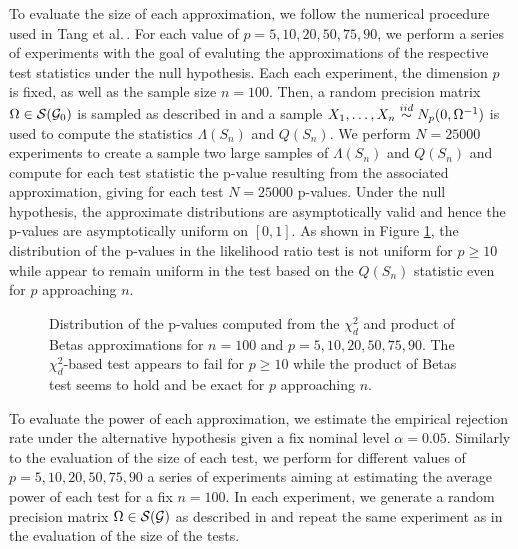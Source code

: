 To evaluate the size of each approximation, we follow the numerical procedure used in Tang et al.\,\cite{Tang2020}. For each value of $p = 5, 10, 20, 50, 75, 90$, we perform a series of experiments with the goal of evaluting the approximations of the respective test statistics under the null hypothesis. Each each experiment, the dimension $p$ is fixed, as well as the sample size $n = 100$. Then, a random precision matrix $\Omega \in {\mathcal{S}}({\mathcal{G}}_0)$ is sampled as described in  and a sample $X_1, \ldots, X_n \stackrel{iid}{\sim} N_p(0, \Omega^{-1})$ is used to compute the statistics $\Lambda(S_n)$ and $Q(S_n)$. We perform $N = 25000$ experiments to create a sample two large samples of $\Lambda(S_n)$ and $Q(S_n)$ and compute for each test statistic the p-value resulting from the associated approximation, giving for each test $N = 25000$ p-values. Under the null hypothesis, the approximate distributions are asymptotically valid and hence the p-values are asymptotically uniform on $[0, 1]$. As shown in Figure \ref{fig-complete-to-4cycle}, the distribution of the p-values in the likelihood ratio test is not uniform for $p \geq 10$ while appear to remain uniform in the test based on the $Q(S_n)$ statistic even for $p$ approaching $n$.

\begin{figure}[!tbp]
    \centering
    \caption{Distribution of the p-values computed from the $\chi^2_d$ and product of Betas approximations for $n = 100$ and $p = 5, 10, 20, 50, 75, 90$. The $\chi^2_d$-based test appears to fail for $p \geq 10$ while the product of Betas test seems to hold and be exact for $p$ approaching $n$.}
    \label{fig-complete-to-4cycle}
\end{figure}

To evaluate the power of each approximation, we estimate the empirical rejection rate under the alternative hypothesis given a fix nominal level $\alpha = 0.05$. Similarly to the evaluation of the size of each test, we perform for different values of $p = 5, 10, 20, 50, 75, 90$ a series of experiments aiming at estimating the average power of each test for a fix $n = 100$. In each experiment, we generate a random precision matrix $\Omega \in {\mathcal{S}}({\mathcal{G}})$ as described in  and repeat the same experiment as in the evaluation of the size of the tests. 